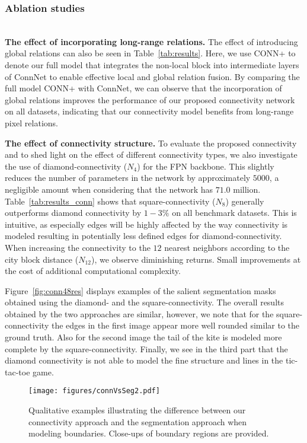 \documentclass[journal]{IEEEtran}
\begin{document}
\subsubsection{Ablation studies}
\textbf{\\The effect of incorporating long-range relations.} 
The effect of introducing global relations can also be seen in Table~\ref{tab:results}. Here, we use {CONN+} to denote our full model that integrates the non-local block into intermediate layers of ConnNet to enable effective local and global relation fusion. By comparing the full model {CONN+} with ConnNet, we can observe that the incorporation of global relations improves the performance of our proposed connectivity network on all datasets, indicating that our connectivity model benefits from long-range pixel relations. 

\noindent\textbf{The effect of connectivity structure.} To evaluate the proposed connectivity and to shed light on the effect of different connectivity types, we also investigate the use of diamond-connectivity ($N_4$) for the FPN backbone. This slightly reduces the number of parameters in the network by approximately $5000$, a negligible amount when considering that the network has $71.0$ million. Table~\ref{tab:results_conn} shows that square-connectivity ($N_8$) generally outperforms diamond connectivity by $1-3\%$ on all benchmark datasets. This is intuitive, as especially edges will be highly affected by the way connectivity is modeled resulting in potentially less defined edges for diamond-connectivity. When increasing the connectivity to the $12$ nearest neighbors according to the city block distance ($N_{12}$), we observe diminishing returns. Small improvements at the cost of additional computational complexity.

Figure~\ref{fig:conn48res} displays examples of the salient segmentation masks obtained using the diamond- and the square-connectivity. The overall results obtained by the two approaches are similar, however, we note that for the square-connectivity the edges in the first image appear more well rounded similar to the ground truth. Also for the second image the tail of the kite is modeled more complete by the square-connectivity. Finally, we see in the third part that the diamond connectivity is not able to model the fine structure and lines in the tic-tac-toe game.

\begin{figure}[t]
\centering
{}
\texttt{[image: figures/connVsSeg2.pdf]}
\caption{Qualitative examples illustrating the difference between our connectivity approach and the segmentation approach when modeling boundaries. Close-ups of boundary regions are provided.}
\label{fig:connVsSeg1}
\end{figure}
\end{document}
